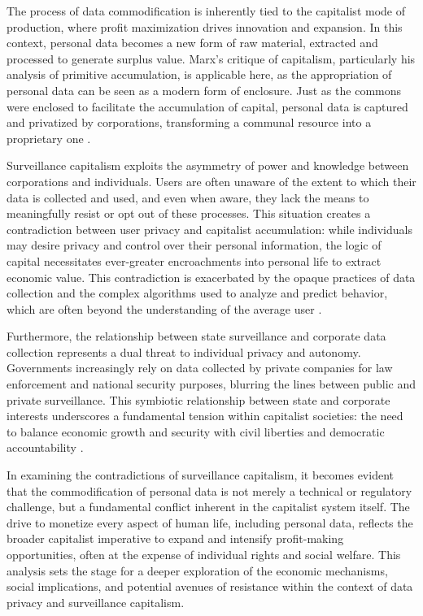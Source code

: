 
The process of data commodification is inherently tied to the capitalist mode of production, where profit maximization drives innovation and expansion. In this context, personal data becomes a new form of raw material, extracted and processed to generate surplus value. Marx's critique of capitalism, particularly his analysis of primitive accumulation, is applicable here, as the appropriation of personal data can be seen as a modern form of enclosure. Just as the commons were enclosed to facilitate the accumulation of capital, personal data is captured and privatized by corporations, transforming a communal resource into a proprietary one \cite[pp.~35-38]{harvey2004new}.

Surveillance capitalism exploits the asymmetry of power and knowledge between corporations and individuals. Users are often unaware of the extent to which their data is collected and used, and even when aware, they lack the means to meaningfully resist or opt out of these processes. This situation creates a contradiction between user privacy and capitalist accumulation: while individuals may desire privacy and control over their personal information, the logic of capital necessitates ever-greater encroachments into personal life to extract economic value. This contradiction is exacerbated by the opaque practices of data collection and the complex algorithms used to analyze and predict behavior, which are often beyond the understanding of the average user \cite[pp.~41-44]{pasquale2015black}.

Furthermore, the relationship between state surveillance and corporate data collection represents a dual threat to individual privacy and autonomy. Governments increasingly rely on data collected by private companies for law enforcement and national security purposes, blurring the lines between public and private surveillance. This symbiotic relationship between state and corporate interests underscores a fundamental tension within capitalist societies: the need to balance economic growth and security with civil liberties and democratic accountability \cite[pp.~113-116]{schneier2015data}.

In examining the contradictions of surveillance capitalism, it becomes evident that the commodification of personal data is not merely a technical or regulatory challenge, but a fundamental conflict inherent in the capitalist system itself. The drive to monetize every aspect of human life, including personal data, reflects the broader capitalist imperative to expand and intensify profit-making opportunities, often at the expense of individual rights and social welfare. This analysis sets the stage for a deeper exploration of the economic mechanisms, social implications, and potential avenues of resistance within the context of data privacy and surveillance capitalism.

